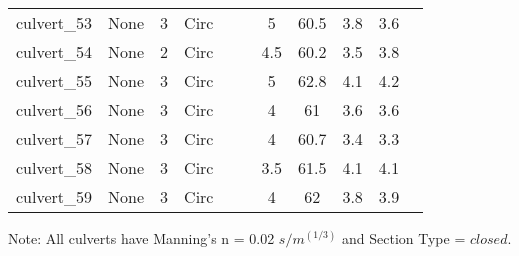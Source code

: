 \begin{table}[]
\begin{tabular}{@{}lcccccccccc@{}}
culvert\_53   & None       & 3        & Circ &        &       & 5        & 60.5   & 3.8       & 3.6        \\
culvert\_54   & None       & 2        & Circ &        &       & 4.5      & 60.2   & 3.5       & 3.8        \\
culvert\_55   & None       & 3        & Circ &        &       & 5        & 62.8   & 4.1       & 4.2        \\
culvert\_56   & None       & 3        & Circ &        &       & 4        & 61     & 3.6       & 3.6        \\
culvert\_57   & None       & 3        & Circ &        &       & 4        & 60.7   & 3.4       & 3.3        \\
culvert\_58   & None       & 3        & Circ &        &       & 3.5      & 61.5   & 4.1       & 4.1        \\
culvert\_59   & None       & 3        & Circ &        &       & 4        & 62     & 3.8       & 3.9        \\
\bottomrule
\end{tabular}
Note: All culverts have Manning's n = 0.02 $s/m^{(1/3)}$ and Section Type = $closed$.

\end{table}
\clearpage


